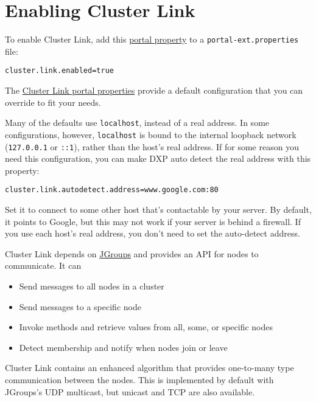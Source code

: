 \section{Enabling Cluster Link}\label{enabling-cluster-link-1}

To enable Cluster Link, add this
\href{/docs/7-2/deploy/-/knowledge_base/d/portal-properties}{portal
property} to a \texttt{portal-ext.properties} file:

\begin{verbatim}
cluster.link.enabled=true
\end{verbatim}

The
\href{@platform-ref@/7.2-latest/propertiesdoc/portal.properties.html\#Cluster\%20Link}{Cluster
Link portal properties} provide a default configuration that you can
override to fit your needs.

Many of the defaults use \texttt{localhost}, instead of a real address.
In some configurations, however, \texttt{localhost} is bound to the
internal loopback network (\texttt{127.0.0.1} or \texttt{::1}), rather
than the host's real address. If for some reason you need this
configuration, you can make DXP auto detect the real address with this
property:

\begin{verbatim}
cluster.link.autodetect.address=www.google.com:80
\end{verbatim}

Set it to connect to some other host that's contactable by your server.
By default, it points to Google, but this may not work if your server is
behind a firewall. If you use each host's real address, you don't need
to set the auto-detect address.

Cluster Link depends on \href{http://www.jgroups.org}{JGroups} and
provides an API for nodes to communicate. It can

\begin{itemize}
\tightlist
\item
  Send messages to all nodes in a cluster
\item
  Send messages to a specific node
\item
  Invoke methods and retrieve values from all, some, or specific nodes
\item
  Detect membership and notify when nodes join or leave
\end{itemize}

Cluster Link contains an enhanced algorithm that provides one-to-many
type communication between the nodes. This is implemented by default
with JGroups's UDP multicast, but unicast and TCP are also available.

